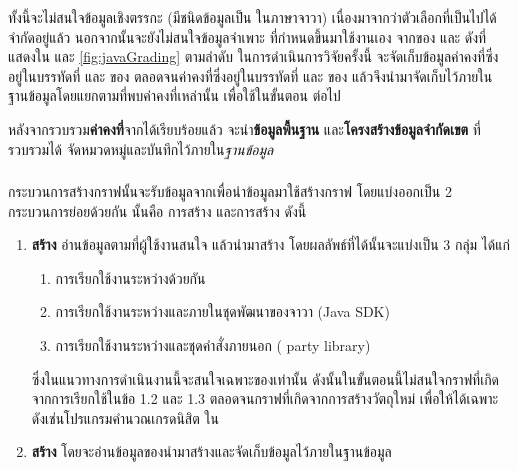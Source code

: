 ทั้งนี้จะไม่สนใจข้อมูลเชิงตรรกะ (มีชนิดข้อมูลเป็น  ในภาษาจาวา) เนื่องมาจากว่าตัวเลือกที่เป็นไปได้จำกัดอยู่แล้ว 
นอกจากนั้นจะยังไม่สนใจข้อมูลจำเพาะ ที่กำหนดขึ้นมาใช้งานเอง 
จาก{\sourcecode}ของ{\class}  และ ดังที่แสดงใน 
 และ \ref{fig:javaGrading} ตามลำดับ ในการดำเนินการวิจัยครั้งนี้ 
จะจัดเก็บข้อมูลค่าคงที่ซึ่งอยู่ในบรรทัดที่  และ  ของ{\class} 
ตลอดจนค่าคงที่ซึ่งอยู่ในบรรทัดที่  และ  ของ{\class}  
แล้วจึงนำมาจัดเก็บไว้ภายในฐานข้อมูลโดยแยกตาม{\class}ที่พบค่าคงที่เหล่านั้น เพื่อใช้ในขั้นตอน {\bf \testcaseGeneration} ต่อไป

หลังจากรวบรวม{\bf ค่าคงที่}จาก{\sourcecode}ได้เรียบร้อยแล้ว จะนำ{\bf ข้อมูลพื้นฐาน} และ{\bf โครงสร้างข้อมูลจำกัดเขต} ที่รวบรวมได้
จัดหมวดหมู่และบันทึกไว้ภายใน{\it ฐานข้อมูล}

\subsubsection{\FirstTimeDefine{\graphCreation}{\graphCreationEN}}
\label{sec:sub:sub:graphCreation}

กระบวนการสร้างกราฟนั้นจะรับข้อมูล{\sourcecode}จาก{\Repository}เพื่อนำข้อมูลมาใช้สร้างกราฟ โดยแบ่งออกเป็น 2 กระบวนการย่อยด้วยกัน 
นั้นคือ การสร้าง{\scg} และการสร้าง{\cfg} ดังนี้

\begin{enumerate}
    \item {\bf สร้าง{\scg}} อ่านข้อมูล{\CUT}ตามที่ผู้ใช้งานสนใจ แล้วนำมาสร้าง{\scg} โดยผลลัพธ์ที่ได้นั้นจะแบ่งเป็น 3 กลุ่ม ได้แก่
        \begin{enumerate}
            \item การเรียกใช้งานระหว่าง{\CUT}ด้วยกัน \label{ord:scgcut} 
            \item การเรียกใช้งานระหว่าง{\CUT}และ{\class}ภายในชุดพัฒนาของจาวา (Java SDK) \label{ord:scgjdk} 
            \item การเรียกใช้งานระหว่าง{\CUT}และชุดคำสั่งภายนอก ( party library) \label{ord:scg3rd} 
        \end{enumerate}
        ซึ่งในแนวทางการดำเนินงานนี้จะสนใจเฉพาะ{\scg}ของ{\CUT}เท่านั้น ดังนั้นในขั้นตอนนี้ไม่สนใจกราฟที่เกิดจากการเรียกใช้ในข้อ 1.2
        และ 1.3 ตลอดจนกราฟที่เกิดจากการสร้างวัตถุใหม่ เพื่อให้ได้{\scg}เฉพาะ{\CUT} ดังเช่น{\scg}โปรแกรมคํานวณเกรดนิสิต ใน

    \item {\bf สร้าง{\cfg}} โดยจะอ่านข้อมูลของ{\CUT}นำมาสร้าง{\cfg}และจัดเก็บข้อมูลไว้ภายในฐานข้อมูล
\end{enumerate}

